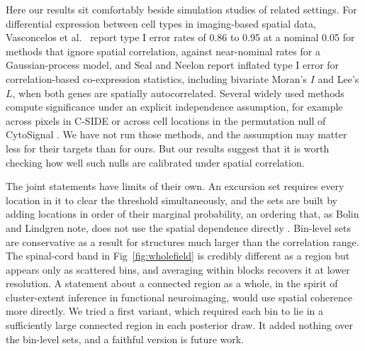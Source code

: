 \documentclass[10pt,letterpaper]{article}
\begin{document}
Here our results sit comfortably beside simulation studies of related settings. For differential expression between cell types in imaging-based spatial data, Vasconcelos et al.\ \cite{vasconcelos2026smide} report type I error rates of 0.86 to 0.95 at a nominal 0.05 for methods that ignore spatial correlation, against near-nominal rates for a Gaussian-process model, and Seal and Neelon \cite{seal2026spacebf} report inflated type I error for correlation-based co-expression statistics, including bivariate Moran's $I$ and Lee's $L$, when both genes are spatially autocorrelated. Several widely used methods compute significance under an explicit independence assumption, for example across pixels in C-SIDE \cite{cable2022cside} or across cell locations in the permutation null of CytoSignal \cite{Liu2026}. We have not run those methods, and the assumption may matter less for their targets than for ours. But our results suggest that it is worth checking how well such nulls are calibrated under spatial correlation.

The joint statements have limits of their own. An excursion set requires every location in it to clear the threshold simultaneously, and the sets are built by adding locations in order of their marginal probability, an ordering that, as Bolin and Lindgren note, does not use the spatial dependence directly \cite{bolin2015excursion}. Bin-level sets are conservative as a result for structures much larger than the correlation range. The spinal-cord band in Fig~\ref{fig:wholefield} is credibly different as a region but appears only as scattered bins, and averaging within blocks recovers it at lower resolution. A statement about a connected region as a whole, in the spirit of cluster-extent inference in functional neuroimaging, would use spatial coherence more directly. We tried a first variant, which required each bin to lie in a sufficiently large connected region in each posterior draw. It added nothing over the bin-level sets, and a faithful version is future work.
\end{document}
